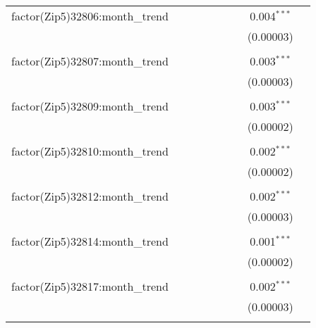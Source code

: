 \begin{table}[H]
{\begin{tabular}{@{\extracolsep{5pt}}lcccccccc}
  factor(Zip5)32806:month\_trend &  &  &  &  &  &  & 0.004$^{***}$ &  \\  

   &  &  &  &  &  &  & (0.00003) &  \\  

   & & & & & & & & \\  

  factor(Zip5)32807:month\_trend &  &  &  &  &  &  & 0.003$^{***}$ &  \\  

   &  &  &  &  &  &  & (0.00003) &  \\  

   & & & & & & & & \\  

  factor(Zip5)32809:month\_trend &  &  &  &  &  &  & 0.003$^{***}$ &  \\  

   &  &  &  &  &  &  & (0.00002) &  \\  

   & & & & & & & & \\  

  factor(Zip5)32810:month\_trend &  &  &  &  &  &  & 0.002$^{***}$ &  \\  

   &  &  &  &  &  &  & (0.00002) &  \\  

   & & & & & & & & \\  

  factor(Zip5)32812:month\_trend &  &  &  &  &  &  & 0.002$^{***}$ &  \\  

   &  &  &  &  &  &  & (0.00003) &  \\  

   & & & & & & & & \\  

  factor(Zip5)32814:month\_trend &  &  &  &  &  &  & 0.001$^{***}$ &  \\  

   &  &  &  &  &  &  & (0.00002) &  \\  

   & & & & & & & & \\  

  factor(Zip5)32817:month\_trend &  &  &  &  &  &  & 0.002$^{***}$ &  \\  

   &  &  &  &  &  &  & (0.00003) &  \\  

   & & & & & & & & \\  


\end{tabular}}
\end{table}
